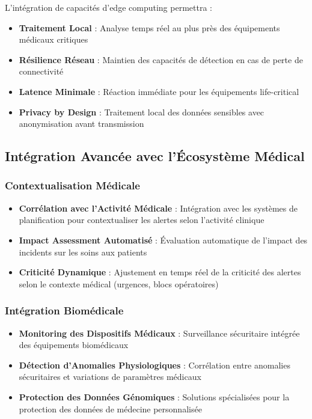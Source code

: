 L'intégration de capacités d'edge computing permettra :

\begin{itemize}
    \item \textbf{Traitement Local} : Analyse temps réel au plus près des équipements médicaux critiques
    \item \textbf{Résilience Réseau} : Maintien des capacités de détection en cas de perte de connectivité
    \item \textbf{Latence Minimale} : Réaction immédiate pour les équipements life-critical
    \item \textbf{Privacy by Design} : Traitement local des données sensibles avec anonymisation avant transmission
\end{itemize}

\subsection{Intégration Avancée avec l'Écosystème Médical}

\subsubsection{Contextualisation Médicale}

\begin{itemize}
    \item \textbf{Corrélation avec l'Activité Médicale} : Intégration avec les systèmes de planification pour contextualiser les alertes selon l'activité clinique
    \item \textbf{Impact Assessment Automatisé} : Évaluation automatique de l'impact des incidents sur les soins aux patients
    \item \textbf{Criticité Dynamique} : Ajustement en temps réel de la criticité des alertes selon le contexte médical (urgences, blocs opératoires)
\end{itemize}

\subsubsection{Intégration Biomédicale}

\begin{itemize}
    \item \textbf{Monitoring des Dispositifs Médicaux} : Surveillance sécuritaire intégrée des équipements biomédicaux
    \item \textbf{Détection d'Anomalies Physiologiques} : Corrélation entre anomalies sécuritaires et variations de paramètres médicaux
    \item \textbf{Protection des Données Génomiques} : Solutions spécialisées pour la protection des données de médecine personnalisée
\end{itemize}

